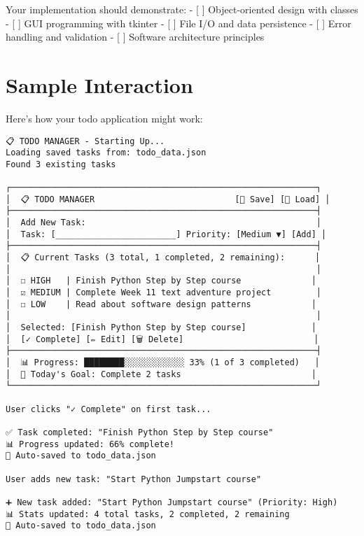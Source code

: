 \documentclass[
  letterpaper,
  DIV=11,
  numbers=noendperiod,
  oneside]{scrreprt}
\begin{document}
Your implementation should demonstrate: - {[} {]} Object-oriented design
with classes - {[} {]} GUI programming with tkinter - {[} {]} File I/O
and data persistence - {[} {]} Error handling and validation - {[} {]}
Software architecture principles

\section{Sample Interaction}\label{sample-interaction-11}

Here's how your todo application might work:

\begin{verbatim}
📋 TODO MANAGER - Starting Up...
Loading saved tasks from: todo_data.json
Found 3 existing tasks

┌─────────────────────────────────────────────────────────────┐
│  📋 TODO MANAGER                            [💾 Save] [📁 Load] │
├─────────────────────────────────────────────────────────────┤
│  Add New Task:                                              │
│  Task: [________________________] Priority: [Medium ▼] [Add] │
├─────────────────────────────────────────────────────────────┤
│  📋 Current Tasks (3 total, 1 completed, 2 remaining):      │
│                                                             │
│  ☐ HIGH   | Finish Python Step by Step course              │
│  ☑ MEDIUM | Complete Week 11 text adventure project         │
│  ☐ LOW    | Read about software design patterns            │
│                                                             │
│  Selected: [Finish Python Step by Step course]             │
│  [✓ Complete] [✏️ Edit] [🗑️ Delete]                          │
├─────────────────────────────────────────────────────────────┤
│  📊 Progress: ████████░░░░░░░░░░░░ 33% (1 of 3 completed)   │
│  🎯 Today's Goal: Complete 2 tasks                          │
└─────────────────────────────────────────────────────────────┘

User clicks "✓ Complete" on first task...

✅ Task completed: "Finish Python Step by Step course"
📊 Progress updated: 66% complete!
💾 Auto-saved to todo_data.json

User adds new task: "Start Python Jumpstart course"

➕ New task added: "Start Python Jumpstart course" (Priority: High)
📊 Stats updated: 4 total tasks, 2 completed, 2 remaining
💾 Auto-saved to todo_data.json
\end{verbatim}
\end{document}
